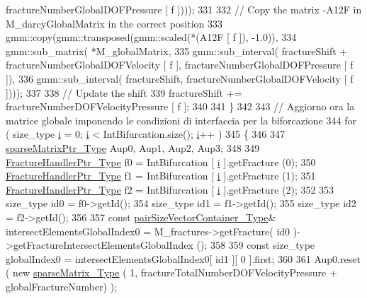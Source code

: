 \begin{DoxyCode}
      fractureNumberGlobalDOFPressure [ f ])));
331 
332        \textcolor{comment}{// Copy the matrix -A12F in M\_darcyGlobalMatrix in the correct position}
333        gmm::copy(gmm::transposed(gmm::scaled(*(A12F [ f ]), -1.0)), 
334                               gmm::sub\_matrix( *M\_globalMatrix, 
335                                       gmm::sub\_interval( fractureShift + fractureNumberGlobalDOFVelocity [ 
      f ], fractureNumberGlobalDOFPressure [ f ]), 
336                                       gmm::sub\_interval( fractureShift, fractureNumberGlobalDOFVelocity [ f
       ])));
337 
338        \textcolor{comment}{// Update the shift}
339        fractureShift += fractureNumberDOFVelocityPressure [ f ];
340 
341     \}
342     
343     \textcolor{comment}{// Aggiorno ora la matrice globale imponendo le condizioni di interfaccia per la biforcazione}
344     \textcolor{keywordflow}{for} ( size\_type \hyperlink{matrici_8m_a6f6ccfcf58b31cb6412107d9d5281426}{i} = 0; \hyperlink{matrici_8m_a6f6ccfcf58b31cb6412107d9d5281426}{i} < IntBifurcation.size(); \hyperlink{matrici_8m_a6f6ccfcf58b31cb6412107d9d5281426}{i}++ )
345     \{
346 
347         \hyperlink{Core_8h_a87137a9501b38c724ac80bc955164bb7}{sparseMatrixPtr\_Type} Aup0, Aup1, Aup2, Aup3;
348             
349         \hyperlink{FractureHandler_8h_af23fb7a30aaff864bd42587af4f1e78a}{FractureHandlerPtr\_Type} f0 = IntBifurcation [ \hyperlink{matrici_8m_a6f6ccfcf58b31cb6412107d9d5281426}{i} ].getFracture (0);
350         \hyperlink{FractureHandler_8h_af23fb7a30aaff864bd42587af4f1e78a}{FractureHandlerPtr\_Type} f1 = IntBifurcation [ \hyperlink{matrici_8m_a6f6ccfcf58b31cb6412107d9d5281426}{i} ].getFracture (1);
351         \hyperlink{FractureHandler_8h_af23fb7a30aaff864bd42587af4f1e78a}{FractureHandlerPtr\_Type} f2 = IntBifurcation [ \hyperlink{matrici_8m_a6f6ccfcf58b31cb6412107d9d5281426}{i} ].getFracture (2);
352         
353         size\_type id0 = f0->getId();
354         size\_type id1 = f1->getId();
355         size\_type id2 = f2->getId();
356 
357         \textcolor{keyword}{const} \hyperlink{Core_8h_a9bc476e433f99b82a9c2b8560735c7b5}{pairSizeVectorContainer\_Type}& intersectElementsGlobalIndex0 = 
      M\_fractures->getFracture( id0 )->getFractureIntersectElementsGlobalIndex ();
358 
359         \textcolor{keyword}{const} size\_type globalIndex0 =  intersectElementsGlobalIndex0[ id1 ][ 0 ].first;
360         
361         Aup0.reset ( \textcolor{keyword}{new} \hyperlink{Core_8h_afba9f623673e2ae32054015bdb5500f9}{sparseMatrix\_Type} ( 1, fractureTotalNumberDOFVelocityPressure + 
      globalFractureNumber) );

\end{DoxyCode}
